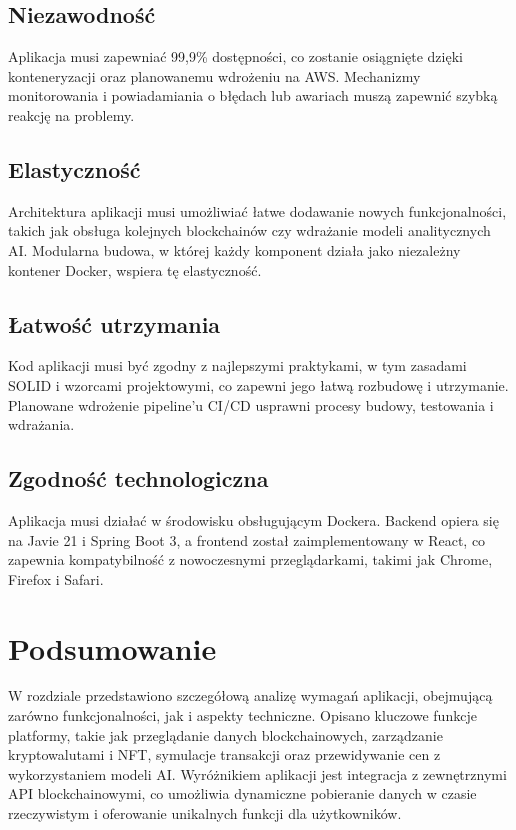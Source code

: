 \subsection{Niezawodność}
Aplikacja musi zapewniać 99,9\% dostępności, co zostanie osiągnięte dzięki konteneryzacji oraz planowanemu wdrożeniu na AWS. Mechanizmy monitorowania i powiadamiania o błędach lub awariach muszą zapewnić szybką reakcję na problemy.

\subsection{Elastyczność}
Architektura aplikacji musi umożliwiać łatwe dodawanie nowych funkcjonalności, takich jak obsługa kolejnych blockchainów czy wdrażanie modeli analitycznych AI. Modularna budowa, w której każdy komponent działa jako niezależny kontener Docker, wspiera tę elastyczność.

\subsection{Łatwość utrzymania}
Kod aplikacji musi być zgodny z najlepszymi praktykami, w tym zasadami SOLID i wzorcami projektowymi, co zapewni jego łatwą rozbudowę i utrzymanie. Planowane wdrożenie pipeline'u CI/CD usprawni procesy budowy, testowania i wdrażania.

\subsection{Zgodność technologiczna}
Aplikacja musi działać w środowisku obsługującym Dockera. Backend opiera się na Javie 21 i Spring Boot 3, a frontend został zaimplementowany w React, co zapewnia kompatybilność z nowoczesnymi przeglądarkami, takimi jak Chrome, Firefox i Safari.


\section{Podsumowanie}

W rozdziale przedstawiono szczegółową analizę wymagań aplikacji, obejmującą zarówno funkcjonalności, jak i aspekty techniczne. Opisano kluczowe funkcje platformy, takie jak przeglądanie danych blockchainowych, zarządzanie kryptowalutami i NFT, symulacje transakcji oraz przewidywanie cen z wykorzystaniem modeli AI. Wyróżnikiem aplikacji jest integracja z zewnętrznymi API blockchainowymi, co umożliwia dynamiczne pobieranie danych w czasie rzeczywistym i oferowanie unikalnych funkcji dla użytkowników.


